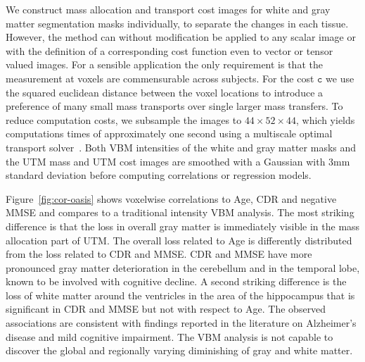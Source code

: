 \documentclass{llncs}
\newcommand{\cost}[0]{\mathtt{c}}
\begin{document}
We construct mass allocation and transport cost images for white and gray
matter segmentation masks individually, to separate the changes in each tissue.
However, the method can without modification be applied to any scalar image or
with the definition of a corresponding cost function even to vector or tensor
valued images. For a sensible application the only requirement is that the
measurement at voxels are commensurable across subjects. For the cost $\cost$
we use the squared euclidean distance between the voxel locations to introduce
a preference of many small mass transports over single larger mass transfers.
To reduce computation costs, we subsample the images to $44 \times 52 \times
44$, which yields computations times of approximately one second using a
multiscale optimal transport solver~\cite{gerber2017multiscale}. Both VBM
intensities of the white and gray matter masks and the UTM mass and UTM cost
images are smoothed with a Gaussian with 3mm standard deviation before
computing correlations or regression models.

Figure~\ref{fig:cor-oasis} shows voxelwise correlations to Age, CDR and
negative MMSE and compares to a traditional intensity VBM analysis. The most
striking difference is that the loss in overall gray matter is immediately
visible in the mass allocation part of UTM. The overall loss related to Age is
differently distributed from the loss related to CDR and MMSE. CDR and MMSE
have more pronounced gray matter deterioration in the cerebellum and in the
temporal lobe, known to be involved with cognitive decline. A second striking
difference is the loss of white matter around the ventricles in the area of the
hippocampus that is significant in CDR and MMSE but not with respect to Age.
The observed associations are consistent with findings reported in the
literature on Alzheimer's disease and mild cognitive impairment.  The VBM
analysis is not capable to discover the global and regionally varying
diminishing of gray and white matter. 
\end{document}
